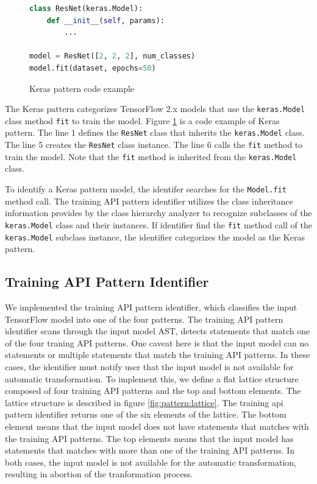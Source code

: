 \begin{figure}[ht!]
  \begin{lstlisting}[language=Python]
class ResNet(keras.Model):
    def __init__(self, params):
        ...

model = ResNet([2, 2, 2], num_classes)
model.fit(dataset, epochs=50)\end{lstlisting}
 
  \caption{Keras pattern code example}
  \label{fig:keraspattern}
\end{figure}

The Keras pattern categorizes TensorFlow 2.x models that use
the {\tt keras.Model} class method {\tt fit} to train the model. 
Figure \ref{fig:keraspattern} is a code example of Keras pattern.
The line 1 defines the {\tt ResNet} class that inherits the 
{\tt keras.Model} class. 
The line 5 creates the {\tt ResNet} class instance.
The line 6 calls the {\tt fit} method to train the model.
Note that the {\tt fit} method is inherited from the {\tt keras.Model} class.

To identify a Keras pattern model, the identifer searches for the
{\tt Model.fit} method call. The training API pattern identifier utilizes the
class inheritance information provides by the class hierarchy analyzer to
recognize subclasses of the {\tt keras.Model} class and their instances.
If identifier find the {\tt fit} method call of the {\tt keras.Model} subclass
instance, the identifier categorizes the model as the Keras pattern.

\subsection{Training API Pattern Identifier}\label{sec:ident}

We implemented the training API pattern identifier, which classifies the
input TensorFlow model into one of the four patterns.
The training API pattern identifier scans through the input model AST,
detects statements that match one of the four traning API patterns.
One caveat here is that the input model can no statements or multiple statements
that match the training API patterns.
In these cases, the identifier must notify user that the
input model is not available for automatic transformation.
To implement this, we define a flat lattice structure composed of four 
training API patterns and the top and bottom elements.
The lattice structure is described in figure \ref{fig:pattern:lattice}.
The training api pattern identifier returns one of the six elements of
the lattice. The bottom element means that the input model does not have
statements that matches with the training API patterns.
The top elements means that the input model has statements that matches with
more than one of the training API patterns.
In both cases, the input model is not available for the automatic 
transformation, resulting in abortion of the tranformation process.

